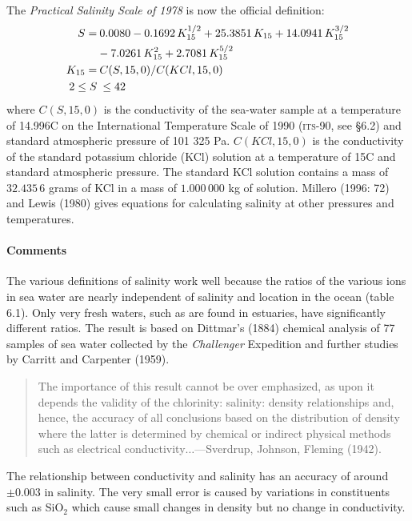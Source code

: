 The \textit{Practical Salinity Scale of 1978} is now the official definition:
\begin{subequations}
\begin{align}
S       = &\:0.0080  -0.1692\,K^{1/2}_{15} + 25.3851\,K_{15} + 14.0941\,K^{3/2}_{15} \notag \\
          &- 7.0261\,K^{2}_{15} + 2.7081\,K^{5/2}_{15} \\
K_{15}  = &\:C(S,15,0)/C(KCl,15,0) \\
2 \leq S &\:\leq 42 \notag
\end{align}
\end{subequations}
where $C(S, 15, 0)$ is the conductivity of the sea-water sample at a temperature of 14.996\degrees C on the International Temperature Scale of 1990 (\textsc{its}-90, see \S 6.2) and standard atmospheric pressure of 101 325 Pa. $C(KCl, 15, 0)$ is the conductivity of the standard potassium chloride (KCl) solution at a temperature of 15\degrees C and standard atmospheric pressure. The standard KCl solution contains a mass of $32.435\,6$ grams of KCl in a mass of $1.000\,000$ kg of solution. Millero (1996: 72) and Lewis (1980) gives equations for calculating salinity at other pressures and temperatures.

\paragraph{Comments} The various definitions of salinity work well because the ratios of the various ions in sea water are nearly independent of salinity and location in the ocean (table 6.1). Only very fresh waters, such as are found in estuaries, have significantly different ratios. The result is based on Dittmar's (1884) chemical analysis of 77 samples of sea water collected by the \textit{Challenger} Expedition and further studies by Carritt and Carpenter (1959).
\begin{quote} \small
The importance of this result cannot be over emphasized, as upon it depends the validity of the chlorinity: salinity: density relationships and, hence, the accuracy of all conclusions based on the distribution of density where the latter is determined by chemical or indirect physical methods such as electrical conductivity$\ldots$---Sverdrup, Johnson, Fleming (1942).
\end{quote}
The relationship between conductivity and salinity has an accuracy of around $\pm 0.003$ in salinity. The very small error is caused by variations in constituents such as SiO$_2$ which cause small changes in density but no change in conductivity.

